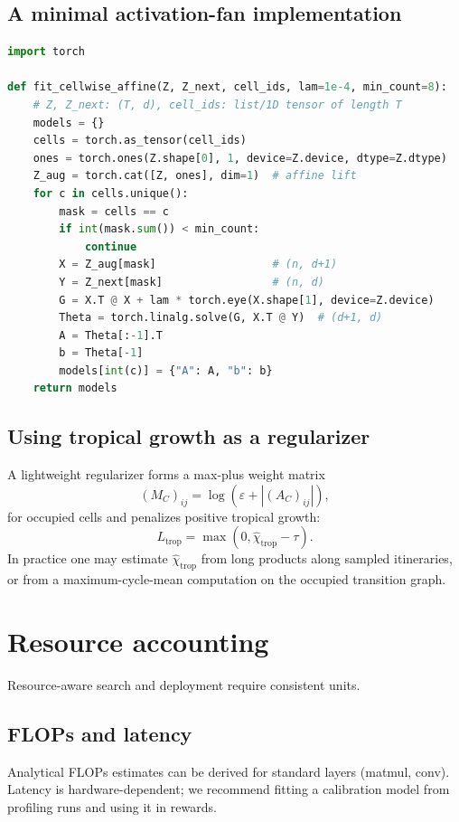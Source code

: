 \documentclass[11pt]{article}
\theoremstyle{definition}
\theoremstyle{plain}
\theoremstyle{remark}
\begin{document}
\subsection{A minimal activation-fan implementation}
\begin{lstlisting}[language=Python,caption={Cellwise affine fitting from logged activation labels.},label={lst:dmd}]
import torch

def fit_cellwise_affine(Z, Z_next, cell_ids, lam=1e-4, min_count=8):
    # Z, Z_next: (T, d), cell_ids: list/1D tensor of length T
    models = {}
    cells = torch.as_tensor(cell_ids)
    ones = torch.ones(Z.shape[0], 1, device=Z.device, dtype=Z.dtype)
    Z_aug = torch.cat([Z, ones], dim=1)  # affine lift
    for c in cells.unique():
        mask = cells == c
        if int(mask.sum()) < min_count:
            continue
        X = Z_aug[mask]                  # (n, d+1)
        Y = Z_next[mask]                 # (n, d)
        G = X.T @ X + lam * torch.eye(X.shape[1], device=Z.device)
        Theta = torch.linalg.solve(G, X.T @ Y)  # (d+1, d)
        A = Theta[:-1].T
        b = Theta[-1]
        models[int(c)] = {"A": A, "b": b}
    return models
\end{lstlisting}

\subsection{Using tropical growth as a regularizer}
A lightweight regularizer forms a max-plus weight matrix
\[
(M_C)_{ij}=\log(\varepsilon + |(A_C)_{ij}|),
\]
for occupied cells and penalizes positive tropical growth:
\[
L_{\mathrm{trop}}=\max(0,\widehat{\chi}_{\mathrm{trop}}-\tau).
\]
In practice one may estimate $\widehat{\chi}_{\mathrm{trop}}$ from long products along sampled itineraries, or from a maximum-cycle-mean computation on the occupied transition graph.

\section{Resource accounting}
\label{app:resources}

Resource-aware search and deployment require consistent units.

\subsection{FLOPs and latency}
Analytical FLOPs estimates can be derived for standard layers (matmul, conv).
Latency is hardware-dependent; we recommend fitting a calibration model from profiling runs and using it in rewards.
\end{document}
